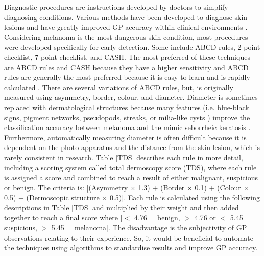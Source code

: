 Diagnostic procedures are instructions developed by doctors to simplify diagnosing conditions. Various methods have been developed to diagnose skin lesions and have greatly improved GP accuracy within clinical environments \cite{Nachbar1994, unlu2014}. Considering melanoma is the most dangerous skin condition, most procedures were developed specifically for early detection. Some include ABCD rules, 2-point checklist, 7-point checklist, and CASH. The most preferred of these techniques are ABCD rules and CASH because they have a higher sensitivity \cite{unlu2014} and ABCD rules are generally the most preferred because it is easy to learn and is rapidly calculated \cite{Nachbar1994}. There are several variations of ABCD rules, but, is originally measured using asymmetry, border, colour, and diameter. Diameter is sometimes replaced with dermatological structures because many features (i.e. blue-black signs, pigment networks, pseudopods, streaks, or milia-like cysts \cite{Stricklin2011}) improve the classification accuracy between melanoma and the mimic seborrheic keratosis \cite{Cognetta1994}. Furthermore, automatically measuring diameter is often difficult because it is dependent on the photo apparatus and the distance from the skin lesion, which is rarely consistent in research. Table \ref{TDS} describes each rule in more detail, including a scoring system called total dermoscopy score (TDS), where each rule is assigned a score and combined to reach a result of either malignant, suspicious or benign. The criteria is: [(Asymmetry $\times$ 1.3) + (Border $\times$ 0.1) + (Colour $\times$ 0.5) + (Dermoscopic structure $\times$ 0.5)]. Each rule is calculated using the following descriptions in Table \ref{TDS} and multiplied by their weight and then added together to reach a final score where [$<$ 4.76 = benign, $>$ 4.76 or $<$ 5.45 = suspicious, $>$ 5.45 = melanoma]. The disadvantage is the subjectivity of GP observations relating to their experience. So, it would be beneficial to automate the techniques using algorithms to standardise results and improve GP accuracy.

